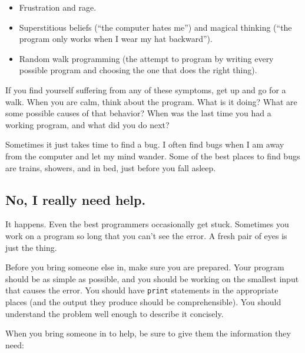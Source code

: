 \documentclass[10pt]{book}
\begin{document}
\begin{itemize}

\item Frustration and rage.


\item Superstitious beliefs (``the computer hates me'') and
magical thinking (``the program only works when I wear my
hat backward'').


\item Random walk programming (the attempt to program by writing
every possible program and choosing the one that does the right
thing).


\end{itemize}

If you find yourself suffering from any of these symptoms, get
up and go for a walk.  When you are calm, think about the program.
What is it doing?  What are some possible causes of that
behavior?  When was the last time you had a working program,
and what did you do next?

Sometimes it just takes time to find a bug.  I often find bugs
when I am away from the computer and let my mind wander.  Some
of the best places to find bugs are trains, showers, and in bed,
just before you fall asleep.


\subsection{No, I really need help.}

It happens.  Even the best programmers occasionally get stuck.
Sometimes you work on a program so long that you can't see the
error.  A fresh pair of eyes is just the thing.

Before you bring someone else in, make sure you are prepared.
Your program should be as simple
as possible, and you should be working on the smallest input
that causes the error.  You should have {\tt print} statements in the
appropriate places (and the output they produce should be
comprehensible).  You should understand the problem well enough
to describe it concisely.

When you bring someone in to help, be sure to give
them the information they need:
\end{document}
